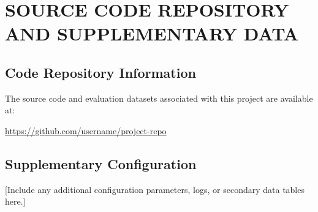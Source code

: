 \chapter{SOURCE CODE REPOSITORY AND SUPPLEMENTARY DATA}
\label{chap:appendix_a}

\section{Code Repository Information}
The source code and evaluation datasets associated with this project are available at:
\begin{center}
    \url{https://github.com/username/project-repo}
\end{center}

\section{Supplementary Configuration}
[Include any additional configuration parameters, logs, or secondary data tables here.]
